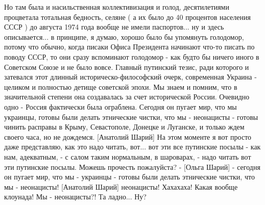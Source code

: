 Но там была и насильственная коллективизация и голод, десятилетиями процветала тотальная бедность, 
селяне ( а их было до 40 процентов населения СССР ) до августа 1974 года вообще
не имели паспортов... ну и здесь описывается... в принципе, я думаю, хорошо было бы упомянуть голодомор,
потому что обычно, когда писаки Офиса Президента начинают что-то писать по поводу СССР, 
то они сразу вспоминают голодомор - как будто бы ничего иного в Советском Союзе 
и не было вовсе. Главный путинский тезис, ради которого и затевался этот длинный историческо-философский 
очерк, современная Украина - целиком и полностью детище советской эпохи. Мы знаем и помним, что в значительной 
степени она создавалась за счет исторической России. Очевидно одно - Россия фактически была ограблена. 
Сегодня он пугает мир, что мы украинцы, готовы были делать этнические чистки, что мы - неонацисты - готовы
чинить расправы в Крыму, Севастополе, Донецке и Луганске, и только ждем своего часа, но не дождемся. 
[Анатолий Шарий] На этом моменте я вот просто даже представляю, как это надо читать, вот... вот эти все путинские посылы - как нам,
адекватным, - с салом таким нормальным, в шароварах, - надо читать вот эти путинские посылы. Можешь прочесть пожалуйста? - 
[Ольга Шарий] - сегодня он пугает мир, что мы - украинцы - готовы были делать этнические чистки, что мы - неонацисты!
[Анатолий Шарий] неонацисты! Хахахаха! Какая вообще клоунада! Мы - неонацисты?! Та ладно... Ну?




